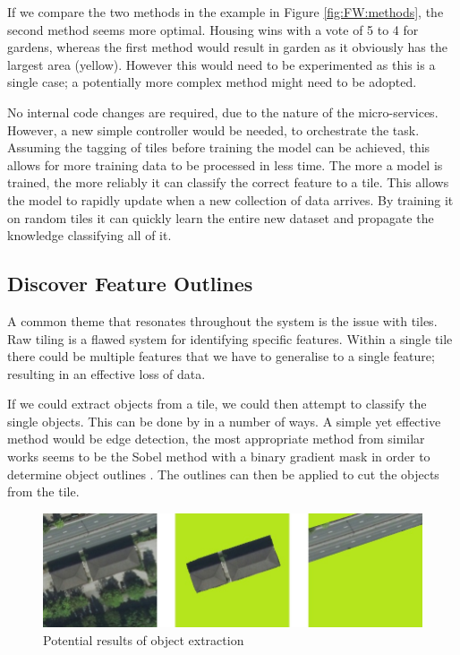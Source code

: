 If we compare the two methods in the example in Figure \ref{fig:FW:methods}, the second method seems more optimal. Housing wins with a vote of 5 to 4 for gardens, whereas the first method would result in garden as it obviously has the largest area (yellow). However this would need to be experimented as this is a single case; a potentially more complex method might need to be adopted. 

No internal code changes are required, due to the nature of the micro-services. However, a new simple controller would be needed, to orchestrate the task. Assuming the tagging of tiles before training the model can be achieved, this allows for more training data to be processed in less time. The more a model is trained, the more reliably it can classify the correct feature to a tile. This allows the model to rapidly update when a new collection of data arrives. By training it on random tiles it can quickly learn the entire new dataset and propagate the knowledge classifying all of it.







\subsection{Discover Feature Outlines}
A common theme that resonates throughout the system is the issue with tiles. Raw tiling is a flawed system for identifying specific features. Within a single tile there could be multiple features that we have to generalise to a single feature; resulting in an effective loss of data. 

If we could extract objects from a tile, we could then attempt to classify the single objects. This can be done by in a number of ways. A simple yet effective method would be edge detection, the most appropriate method from similar works seems to be the Sobel method with a binary gradient mask in order to determine object outlines \citep{sobel_method}. The outlines can then be applied to cut the objects from the tile. 

\begin{figure}[H]
    \centering
    \includegraphics[width=\textwidth]{figs/12/sobel}
    \caption{Potential results of object extraction}
    \label{fig:FW:sobel}
\end{figure}

